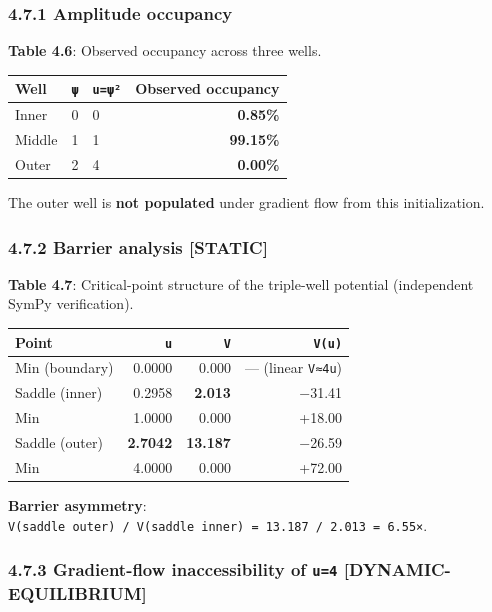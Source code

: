 \documentclass[
]{article}
\begin{document}
\hypertarget{amplitude-occupancy}{%
\subsubsection{4.7.1 Amplitude occupancy}\label{amplitude-occupancy}}

\textbf{Table 4.6}: Observed occupancy across three wells.

\begin{longtable}[]{@{}lllr@{}}
\toprule\noalign{}
Well & \texttt{\textbar{}ψ\textbar{}} &
\texttt{u=\textbar{}ψ\textbar{}²} & Observed occupancy \\
\midrule\noalign{}
\endhead
\bottomrule\noalign{}
\endlastfoot
Inner & 0 & 0 & \textbf{0.85\%} \\
Middle & 1 & 1 & \textbf{99.15\%} \\
Outer & 2 & 4 & \textbf{0.00\%} \\
\end{longtable}

The outer well is \textbf{not populated} under gradient flow from this
initialization.

\hypertarget{barrier-analysis-static}{%
\subsubsection{4.7.2 Barrier analysis
{[}STATIC{]}}\label{barrier-analysis-static}}

\textbf{Table 4.7}: Critical-point structure of the triple-well
potential (independent SymPy verification).

\begin{longtable}[]{@{}lrrr@{}}
\toprule\noalign{}
Point & \texttt{u} & \texttt{V} &
\texttt{V\textquotesingle{}\textquotesingle{}(u)} \\
\midrule\noalign{}
\endhead
\bottomrule\noalign{}
\endlastfoot
Min (boundary) & 0.0000 & 0.000 & --- (linear \texttt{V≈4u}) \\
Saddle (inner) & 0.2958 & \textbf{2.013} & −31.41 \\
Min & 1.0000 & 0.000 & +18.00 \\
Saddle (outer) & \textbf{2.7042} & \textbf{13.187} & −26.59 \\
Min & 4.0000 & 0.000 & +72.00 \\
\end{longtable}

\textbf{Barrier asymmetry}:
\texttt{V(saddle\ outer)\ /\ V(saddle\ inner)\ =\ 13.187\ /\ 2.013\ =\ 6.55×}.

\hypertarget{gradient-flow-inaccessibility-of-u4-dynamic-equilibrium}{%
\subsubsection{\texorpdfstring{4.7.3 Gradient-flow inaccessibility of
\texttt{u=4}
{[}DYNAMIC-EQUILIBRIUM{]}}{4.7.3 Gradient-flow inaccessibility of u=4 {[}DYNAMIC-EQUILIBRIUM{]}}}\label{gradient-flow-inaccessibility-of-u4-dynamic-equilibrium}}
\end{document}
